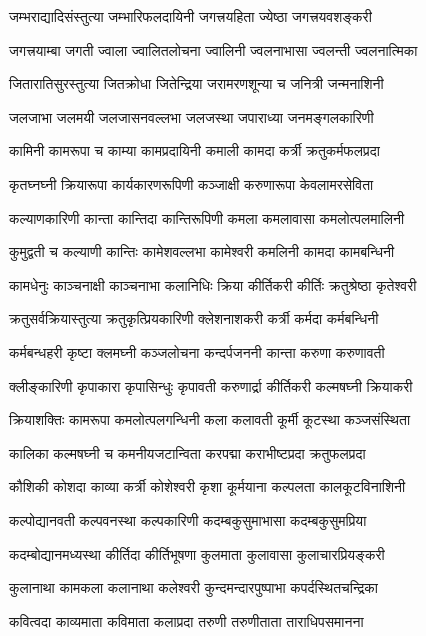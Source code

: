 \twolineshloka
{जम्भराद्यादिसंस्तुत्या जम्भारिफलदायिनी}
{जगत्त्रयहिता ज्येष्ठा जगत्त्रयवशङ्करी}%

\twolineshloka
{जगत्त्रयाम्बा जगती ज्वाला ज्वालितलोचना}
{ज्वालिनी ज्वलनाभासा ज्वलन्ती ज्वलनात्मिका}%

\twolineshloka
{जितारातिसुरस्तुत्या जितक्रोधा जितेन्द्रिया}
{जरामरणशून्या च जनित्री जन्मनाशिनी}%

\twolineshloka
{जलजाभा जलमयी जलजासनवल्लभा}
{जलजस्था जपाराध्या जनमङ्गलकारिणी}%

\twolineshloka
{कामिनी कामरूपा च काम्या कामप्रदायिनी}
{कमाली कामदा कर्त्री क्रतुकर्मफलप्रदा}%

\twolineshloka
{कृतघ्नघ्नी क्रियारूपा कार्यकारणरूपिणी}
{कञ्जाक्षी करुणारूपा केवलामरसेविता}%

\twolineshloka
{कल्याणकारिणी कान्ता कान्तिदा कान्तिरूपिणी}
{कमला कमलावासा कमलोत्पलमालिनी}%

\twolineshloka
{कुमुद्वती च कल्याणी कान्तिः कामेशवल्लभा}
{कामेश्वरी कमलिनी कामदा कामबन्धिनी}%

\twolineshloka
{कामधेनुः काञ्चनाक्षी काञ्चनाभा कलानिधिः}
{क्रिया कीर्तिकरी कीर्तिः क्रतुश्रेष्ठा कृतेश्वरी}%

\twolineshloka
{क्रतुसर्वक्रियास्तुत्या क्रतुकृत्प्रियकारिणी}
{क्लेशनाशकरी कर्त्री कर्मदा कर्मबन्धिनी}%

\twolineshloka
{कर्मबन्धहरी कृष्टा क्लमघ्नी कञ्जलोचना}
{कन्दर्पजननी कान्ता करुणा करुणावती}%

\twolineshloka
{क्लीङ्कारिणी कृपाकारा कृपासिन्धुः कृपावती}
{करुणार्द्रा कीर्तिकरी कल्मषघ्नी क्रियाकरी}%

\twolineshloka
{क्रियाशक्तिः कामरूपा कमलोत्पलगन्धिनी}
{कला कलावती कूर्मी कूटस्था कञ्जसंस्थिता}%

\twolineshloka
{कालिका कल्मषघ्नी च कमनीयजटान्विता}
{करपद्मा कराभीष्टप्रदा क्रतुफलप्रदा}%

\twolineshloka
{कौशिकी कोशदा काव्या कर्त्री कोशेश्वरी कृशा}
{कूर्मयाना कल्पलता कालकूटविनाशिनी}%

\twolineshloka
{कल्पोद्यानवती कल्पवनस्था कल्पकारिणी}
{कदम्बकुसुमाभासा कदम्बकुसुमप्रिया}%

\twolineshloka
{कदम्बोद्यानमध्यस्था कीर्तिदा कीर्तिभूषणा}
{कुलमाता कुलावासा कुलाचारप्रियङ्करी}%

\twolineshloka
{कुलानाथा कामकला कलानाथा कलेश्वरी}
{कुन्दमन्दारपुष्पाभा कपर्दस्थितचन्द्रिका}%

\twolineshloka
{कवित्वदा काव्यमाता कविमाता कलाप्रदा}
{तरुणी तरुणीताता ताराधिपसमानना}%

